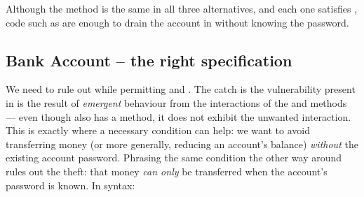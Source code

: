 Although the  method is the same in
all three alternatives, and each one satisfies ,
code such as
%
%
are enough to drain the account in  without knowing the password.


 \subsection{Bank Account -- the right specification}
\label{s:bankSpecEx}

We need to rule out  while permitting  and
. The catch is the vulnerability present in  is the result
of  \emph{emergent} behaviour from the interactions of the 
and  methods --- even though  also has a
 method, it does not exhibit the unwanted interaction.
This is exactly where a necessary condition can help:
we want to avoid transferring money
(or more generally, reducing an account's balance)
\textit{without} the existing account password.  Phrasing the same condition
the other way around %
rules out the theft: that money \textit{can only} be
transferred when the account's password is known.
In \Nec  syntax:

